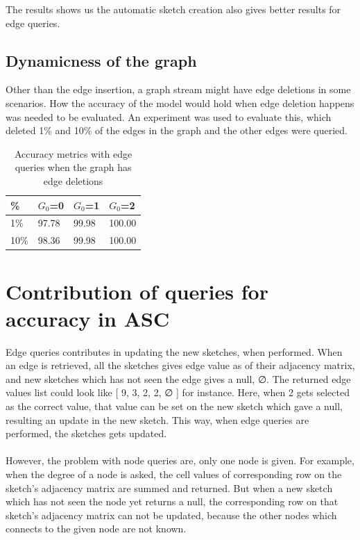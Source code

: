 \documentclass[12pt]{report}
\numberwithin{figure}{section}
\numberwithin{table}{section}
\begin{document}
The results shows us the automatic sketch creation also gives better results for edge queries.

\subsection{Dynamicness of the graph}

Other than the edge insertion, a graph stream might have edge deletions in some scenarios. How the accuracy of the model would hold when edge deletion happens was needed to be evaluated. An experiment was used to evaluate this, which deleted 1\% and 10\% of the edges in the graph and the other edges were queried. 


\begin{table}[H]
\centering
\begin{tabular}{|l|l|l|l|}
\hline
\%     & $G_0$=0 & $G_0$=1 & $G_0$=2 \\ \hline
1\% & 97.78   & 99.98   & 100.00   \\ \hline
10\% & 98.36   & 99.98   & 100.00   \\ \hline
\end{tabular}
\caption{Accuracy metrics with edge queries when the graph has edge deletions}
\end{table}

\section{Contribution of queries for accuracy in ASC}

Edge queries contributes in updating the new sketches, when performed. When an edge is retrieved, all the  sketches gives edge value as of their adjacency matrix, and new sketches which has not seen the edge gives a null, ∅. The returned edge values list could look like [ 9, 3, 2, 2, ∅ ] for instance. Here, when 2 gets selected as the correct value, that value can be set on the new sketch which gave a null, resulting an update in the new sketch. This way, when edge queries are performed, the sketches gets updated. 

\paragraph{}

However, the problem with node queries are, only one node is given. For example, when the degree of a node is asked, the cell values of corresponding row on the sketch's adjacency matrix are summed and returned. But when a new sketch which has not seen the node yet returns a null, the corresponding row on that sketch's adjacency matrix  can not be updated, because the other nodes which connects to the given node are not known. 
\end{document}
